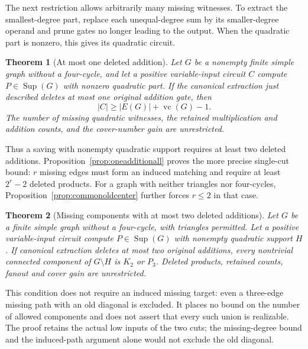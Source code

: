 \documentclass[11pt]{article}
\newcommand{\Sup}{\operatorname{Sup}}
\newcommand{\vc}{\operatorname{vc}}
\newtheorem{theorem}{Theorem}[section]
\theoremstyle{definition}
\theoremstyle{remark}
\begin{document}
The next restriction allows arbitrarily many missing witnesses. To extract the smallest-degree part, replace each unequal-degree sum by its smaller-degree operand and prune gates no longer leading to the output. When the quadratic part is nonzero, this gives its quadratic circuit.

\begin{theorem}[At most one deleted addition]\label{thm:oneaddition}
Let $G$ be a nonempty finite simple graph without a four-cycle, and let a positive variable-input circuit $C$ compute $P\in\Sup(G)$ with nonzero quadratic part. If the canonical extraction just described deletes at most one original addition gate, then
\[
 |C|\ge |E(G)|+\vc(G)-1.
\]
The number of missing quadratic witnesses, the retained multiplication and addition counts, and the cover-number gain are unrestricted.
\end{theorem}
Thus a saving with nonempty quadratic support requires at least two deleted additions. Proposition~\ref{prop:oneadditionall} proves the more precise single-cut bound: $r$ missing edges must form an induced matching and require at least $2^r-2$ deleted products. For a graph with neither triangles nor four-cycles, Proposition~\ref{prop:commonoldcenter} further forces $r\le2$ in that case.

\begin{theorem}[Missing components with at most two deleted additions]\label{thm:twosumscomponents}
Let $G$ be a finite simple graph without a four-cycle, with triangles permitted. Let a positive variable-input circuit compute $P\in\Sup(G)$ with nonempty quadratic support $H$. If canonical extraction deletes at most two original additions, every nontrivial connected component of $G\setminus H$ is $K_2$ or $P_3$. Deleted products, retained counts, fanout and cover gain are unrestricted.
\end{theorem}
This condition does not require an induced missing target: even a three-edge missing path with an old diagonal is excluded. It places no bound on the number of allowed components and does not assert that every such union is realizable. The proof retains the actual low inputs of the two cuts; the missing-degree bound and the induced-path argument alone would not exclude the old diagonal.
\end{document}
